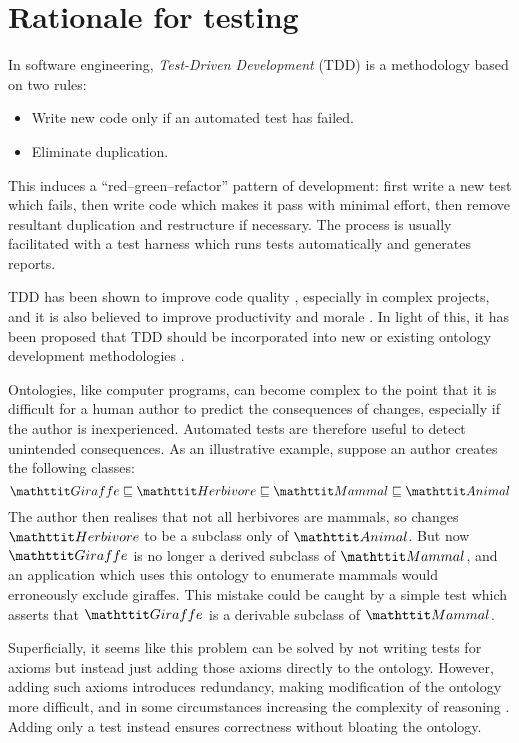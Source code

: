 \documentclass[paper.tex]{subfiles}
\begin{document}
\section{Rationale for testing}
\label{sec:rationale}

In software engineering, \emph{Test-Driven Development} (TDD) \cite{Beck:TDD} is a methodology based on two rules:
\begin{itemize}[nosep]
  \item Write new code only if an automated test has failed.
  \item Eliminate duplication.
\end{itemize}
This induces a ``red--green--refactor'' pattern of development: first write a new test which fails, then write code which makes it pass with minimal effort, then remove resultant duplication and restructure if necessary.
The process is usually facilitated with a test harness which runs tests automatically and generates reports.

TDD has been shown to improve code quality \cite{Rafique:TDD}, especially in complex projects, and it is also believed to improve productivity and morale \cite{Beck:TDD}.
In light of this, it has been proposed that TDD should be incorporated into new or existing ontology development methodologies \cite{Keet:TDDOntologies}.

Ontologies, like computer programs, can become complex to the point that it is difficult for a human author to predict the consequences of changes, especially if the author is inexperienced.
Automated tests are therefore useful to detect unintended consequences.
As an illustrative example, suppose an author creates the following classes:
\[ \oent{Giraffe} \sqsubseteq \oent{Herbivore} \sqsubseteq \oent{Mammal} \sqsubseteq \oent{Animal} \]
The author then realises that not all herbivores are mammals, so changes $\oent{Herbivore}$ to be a subclass only of $\oent{Animal}$.
But now $\oent{Giraffe}$ is no longer a derived subclass of $\oent{Mammal}$, and an application which uses this ontology to enumerate mammals would erroneously exclude giraffes.
This mistake could be caught by a simple test which asserts that $\oent{Giraffe}$ is a derivable subclass of $\oent{Mammal}$.

Superficially, it seems like this problem can be solved by not writing tests for axioms but instead just adding those axioms directly to the ontology.
However, adding such axioms introduces redundancy, making modification of the ontology more difficult, and in some circumstances increasing the complexity of reasoning \cite{Vrandecic:UnitTestsOntologies}.
Adding only a test instead ensures correctness without bloating the ontology.
\end{document}

